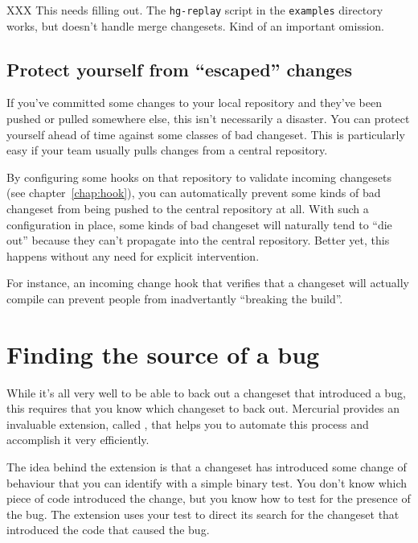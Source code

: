 XXX This needs filling out.  The \texttt{hg-replay} script in the
\texttt{examples} directory works, but doesn't handle merge
changesets.  Kind of an important omission.

\subsection{Protect yourself from ``escaped'' changes}

If you've committed some changes to your local repository and they've
been pushed or pulled somewhere else, this isn't necessarily a
disaster.  You can protect yourself ahead of time against some classes
of bad changeset.  This is particularly easy if your team usually
pulls changes from a central repository.

By configuring some hooks on that repository to validate incoming
changesets (see chapter~\ref{chap:hook}), you can automatically
prevent some kinds of bad changeset from being pushed to the central
repository at all.  With such a configuration in place, some kinds of
bad changeset will naturally tend to ``die out'' because they can't
propagate into the central repository.  Better yet, this happens
without any need for explicit intervention.

For instance, an incoming change hook that verifies that a changeset
will actually compile can prevent people from inadvertantly ``breaking
the build''.

\section{Finding the source of a bug}
\label{sec:undo:bisect}

While it's all very well to be able to back out a changeset that
introduced a bug, this requires that you know which changeset to back
out.  Mercurial provides an invaluable extension, called
, that helps you to automate this process and accomplish
it very efficiently.

The idea behind the  extension is that a changeset has
introduced some change of behaviour that you can identify with a
simple binary test.  You don't know which piece of code introduced the
change, but you know how to test for the presence of the bug.  The
 extension uses your test to direct its search for the
changeset that introduced the code that caused the bug.

